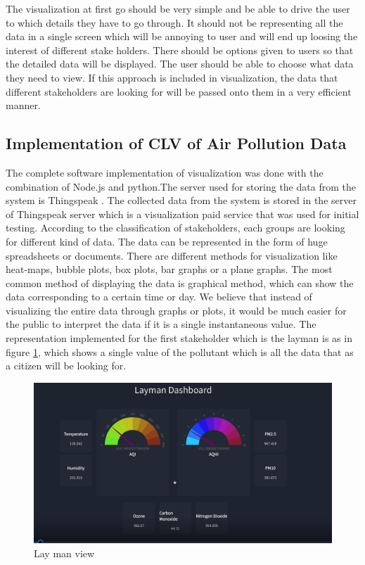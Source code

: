 The visualization at first go should be very simple and be able to drive the user to which details they have to go through. It should not be representing all the data in a single screen which will be annoying to user and will end up loosing the interest of different stake holders. There should be options given to users so that the detailed data will be displayed. The user should be able to choose what data they need to view. If this approach is included in visualization, the data that different stakeholders are looking for will be passed onto them in a very efficient manner.

\subsection{Implementation of CLV of Air Pollution Data}

The complete software implementation of visualization was done with the combination of Node.js and python.The server used for storing the data from the system is Thingspeak \cite{thingspeak}. The collected data from the system is stored in the server of Thingspeak server \cite{thingspeak} which is a visualization paid service that was used for initial testing. 
According to the classification of stakeholders, each groups are looking for different kind of data. The data can be represented in the form of huge spreadsheets or documents. There are different methods for visualization like heat-maps, bubble plots, box plots, bar graphs or a plane graphs. The most common method of displaying the data is graphical method, which can show the data corresponding to a certain time or day. We believe that instead of visualizing the entire data through graphs or plots, it would be much easier for the public to interpret the data if it is a single instantaneous value. The  representation implemented for the first stakeholder which is the layman is as in figure \ref{view1}, which shows a single value of the pollutant which is all the data that as a citizen will be looking for.

\begin{figure}[h]
  \begin{center}
  \includegraphics[scale=0.55]{./images/figure14.png}
  \end{center}
  \caption{Lay man view}
  \label{view1}
\end{figure}

